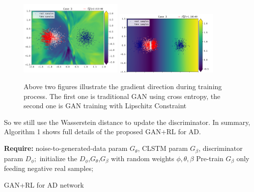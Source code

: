 \documentclass{acmtog} %
\begin{document}
\begin{figure}[h]
	\begin{center}
		\includegraphics[width=0.45\textwidth]{lip1.png}
		\includegraphics[width=0.45\textwidth]{lip2.png}
	\end{center}
	\caption{Above two figures illustrate the gradient direction during training process. The first one is traditional GAN using cross entropy, the second one is GAN training with Lipschitz Constraint}
	\label{RTL}
\end{figure}

So we still use the Wasserstein distance to update the discriminator. In summary, Algorithm 1 shows full details of the proposed GAN+RL for AD.

\IncMargin{1em}
\begin{algorithm}
	\SetAlgoLined
	\DontPrintSemicolon
	\LinesNumbered
	\BlankLine
	\textbf{Require:} noise-to-generated-data param $ G_{\theta} $, CLSTM param $ G_{\beta} $, discriminator param $ D_{\phi}; $ \;
	\BlankLine
   initialize the $ D_{\phi} $,$ G_{\theta}$,$ G_{\beta} $ with random weights $ \phi, \theta ,\beta$ \;
    Pre-train $ G_{\beta} $ only feeding negative real samples; \;
    \BlankLine
    \caption{GAN+RL for AD network \label{IR}}
\end{algorithm}\DecMargin{1em}
 		
\end{document}
